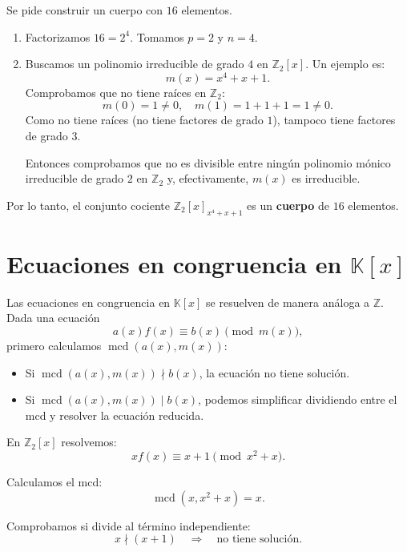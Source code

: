 \documentclass[a4paper,12pt]{article}
\begin{document}
\begin{ejemplo}[title=Ejemplo: Construcción de un cuerpo finito]
Se pide construir un cuerpo con \(16\) elementos.

\begin{enumerate}
    \item Factorizamos \(16 = 2^4\). Tomamos \(p = 2\) y \(n = 4\).  
    \item Buscamos un polinomio irreducible de grado \(4\) en \(\mathbb{Z}_2[x]\). Un ejemplo es:
    \[
    m(x) = x^4 + x + 1.
    \]
    Comprobamos que no tiene raíces en \(\mathbb{Z}_2\):
    \[
    m(0) = 1 \neq 0, \quad m(1) = 1 + 1 + 1 = 1 \neq 0.
    \]
    Como no tiene raíces (no tiene factores de grado \(1\)), tampoco tiene factores de grado \(3\).
    
    Entonces comprobamos que no es divisible entre ningún polinomio mónico irreducible de grado \(2\) en \(\mathbb{Z}_2\) y, efectivamente, \(m(x)\) es irreducible.
\end{enumerate}

Por lo tanto, el conjunto cociente
\(
\mathbb{Z}_2[x]_{x^4+x+1}
\)
es un \textbf{cuerpo} de \(16\) elementos.
\end{ejemplo}

\section{Ecuaciones en congruencia en \(\mathbb{K}[x]\)}

\begin{procedimiento}[title=Resolución de ecuaciones en congruencia]
Las ecuaciones en congruencia en \(\mathbb{K}[x]\) se resuelven de manera análoga a \(\mathbb{Z}\).  
Dada una ecuación
\[
a(x) f(x) \equiv b(x) \pmod{m(x)},
\]
primero calculamos \(\operatorname{mcd}(a(x), m(x))\):
\begin{itemize}
    \item Si \(\operatorname{mcd}(a(x), m(x)) \nmid b(x)\), la ecuación no tiene solución.
    \item Si \(\operatorname{mcd}(a(x), m(x)) \mid b(x)\), podemos simplificar dividiendo entre el mcd y resolver la ecuación reducida.
\end{itemize}
\end{procedimiento}

\begin{ejemplo}[title=Ejemplo 1: Sin solución]
En \(\mathbb{Z}_2[x]\) resolvemos:
\[
x f(x) \equiv x+1 \pmod{x^2+x}.
\]

Calculamos el mcd:
\[
\operatorname{mcd}(x, x^2+x) = x.
\]

Comprobamos si divide al término independiente:
\[
x \nmid (x+1) \quad \Rightarrow \quad \text{no tiene solución.}
\]
\end{ejemplo}
\end{document}
